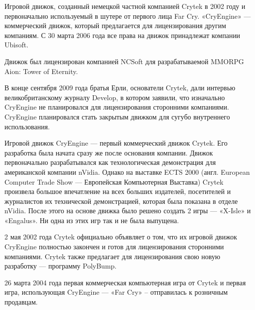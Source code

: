 Игровой движок, созданный немецкой частной компанией Crytek в 2002 году и первоначально используемый в шутере от первого лица Far Cry. «CryEngine» — коммерческий движок, который предлагается для лицензирования другим компаниям. С 30 марта 2006 года все права на движок принадлежат компании Ubisoft.

Движок был лицензирован компанией NCSoft для разрабатываемой MMORPG Aion: Tower of Eternity.

В конце сентября 2009 года братья Ерли, основатели Crytek, дали интервью великобританскому журналу Develop, в котором заявили, что изначально CryEngine не планировался для лицензирования сторонними компаниями. CryEngine планировался стать закрытым движком для сугубо внутреннего использования.

Игровой движок CryEngine — первый коммерческий движок Crytek. Его разработка была начата сразу же после основания компании. Движок первоначально разрабатывался как технологическая демонстрация для американской компании nVidia. Однако на выставке ECTS 2000 (англ. European Computer Trade Show — Европейская Компьютерная Выставка) Crytek произвела большое впечатление на всех больших издателей, посетителей и журналистов их технической демонстрацией, которая была показана в отделе nVidia. После этого на основе движка было решено создать 2 игры — «X-Isle» и «Engalus». Ни одна из этих игр так и не была выпущена.

2 мая 2002 года Crytek официально объявляет о том, что их игровой движок CryEngine полностью закончен и готов для лицензирования сторонними компаниями. Crytek также предлагает для лицензирования свою новую разработку — программу PolyBump.

26 марта 2004 года первая коммерческая компьютерная игра от Crytek и первая игра, использующая CryEngine — «Far Cry» -- отправилась к розничным продавцам.

